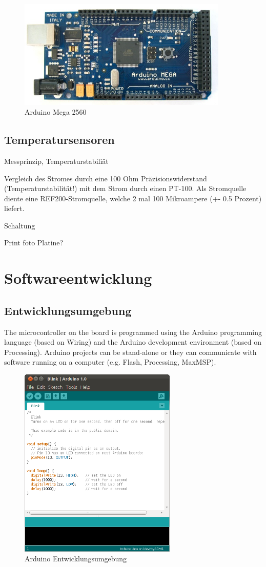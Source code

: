 \documentclass[a4paper,bibtotoc,oneside]{scrbook}
\begin{document}
\begin{figure}[htbp]
\centering
\includegraphics[width=100mm]{img/ArduinoMega.jpg}
\caption[Arduino Mega 2560]{Arduino Mega 2560}\label{ardu}
\end{figure}

\subsection{Temperatursensoren}\thispagestyle{empty}
Messprinzip, Temperaturstabiliät

Vergleich des Stromes durch eine 100 Ohm Präzisionswiderstand (Temperaturstabilität!) mit dem Strom durch einen PT-100. Als Stromquelle diente eine REF200-Stromquelle, welche 2 mal 100 Mikroampere (+- 0.5 Prozent) liefert.

Schaltung

Print foto Platine?



\section{Softwareentwicklung}\thispagestyle{empty}
\subsection{Entwicklungsumgebung}\thispagestyle{empty}
The microcontroller on the board is programmed using the Arduino programming language (based on Wiring) and the Arduino development environment (based on Processing). Arduino projects can be stand-alone or they can communicate with software running on a computer (e.g. Flash, Processing, MaxMSP). 
\begin{figure}[htbp]
\centering
\includegraphics[width=75mm]{img/Arduino.png}
\caption[Arduino Entwicklungsumgebung]{Arduino Entwicklungsumgebung}\label{ardu2}
\end{figure}
\end{document}

